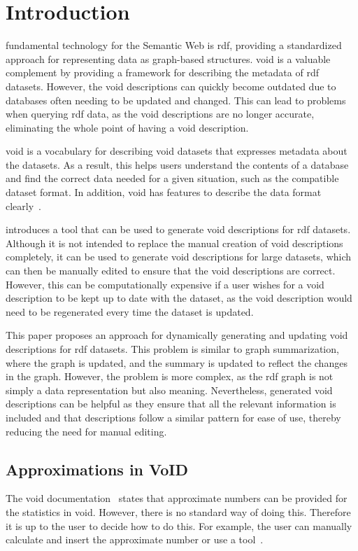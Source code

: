 \section{Introduction}\label{sec:introduction2}
 fundamental technology for the Semantic Web is \gls{rdf}, providing a standardized approach for representing data as graph-based structures. \gls{void} is a valuable complement by providing a framework for describing the metadata of \gls{rdf} datasets. However, the \gls{void} descriptions can quickly become outdated due to databases often needing to be updated and changed. This can lead to problems when querying \gls{rdf} data, as the \gls{void} descriptions are no longer accurate, eliminating the whole point of having a \gls{void} description.

\gls{void} is a vocabulary for describing \gls{void} datasets that expresses metadata about the datasets. As a result, this helps users understand the contents of a database and find the correct data needed for a given situation, such as the compatible dataset format. In addition, \gls{void} has features to describe the data format clearly~\cite{documentation-void}.

\cite{creating-void-descriptions} introduces a tool that can be used to generate \gls{void} descriptions for \gls{rdf} datasets. Although it is not intended to replace the manual creation of \gls{void} descriptions completely, it can be used to generate \gls{void} descriptions for large datasets, which can then be manually edited to ensure that the \gls{void} descriptions are correct. However, this can be computationally expensive if a user wishes for a \gls{void} description to be kept up to date with the dataset, as the \gls{void} description would need to be regenerated every time the dataset is updated.

This paper proposes an approach for dynamically generating and updating \gls{void} descriptions for \gls{rdf} datasets. This problem is similar to graph summarization, where the graph is updated, and the summary is updated to reflect the changes in the graph. However, the problem is more complex, as the \gls{rdf} graph is not simply a data representation but also meaning. Nevertheless, generated \gls{void} descriptions can be helpful as they ensure that all the relevant information is included and that descriptions follow a similar pattern for ease of use, thereby reducing the need for manual editing.

\subsection{Approximations in VoID} \label{sec:approximations}
The \gls{void} documentation~\cite{documentation-void} states that approximate numbers can be provided for the statistics in \gls{void}.
However, there is no standard way of doing this. Therefore it is up to the user to decide how to do this. For example, the user can manually calculate and insert the approximate number or use a tool~\cite{the-web-of-data}.

